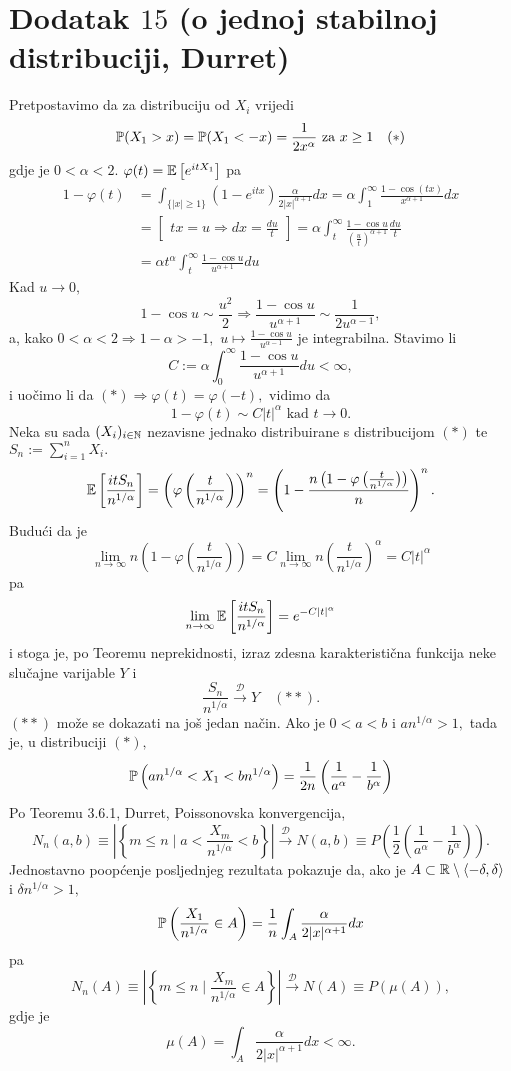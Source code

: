 \documentclass{article}
\begin{document}
\section{Dodatak \(15\) (o jednoj stabilnoj distribuciji, Durret)}
Pretpostavimo da za distribuciju od \(X_i\) vrijedi \[\Bbb P(X_1>x)=\Bbb P(X_1<-x)=\frac1{2x^\alpha}\text{ za }x\ge1\quad(\ast)\] gdje je \(0<\alpha<2.\) \(\varphi(t)=\Bbb E\left[e^{itX_1}\right]\) pa \[\begin{aligned}1-\varphi(t)&=\int_{\{|x|\ge1\}}\left(1-e^{itx}\right)\frac\alpha{2|x|^{\alpha+1}}dx=\alpha\int_1^\infty\frac{1-\cos(tx)}{x^{\alpha+1}}dx\\&=\begin{bmatrix}tx=u\Rightarrow dx=\frac{du}t\end{bmatrix}=\alpha\int_t^\infty\frac{1-\cos u}{\left(\frac{u}t\right)^{\alpha+1}}\frac{du}t\\&=\alpha t^\alpha\int_t^\infty\frac{1-\cos u}{u^{\alpha+1}}du\end{aligned}\] Kad \(u\to0,\) \[1-\cos u\sim\frac{u^2}2\Rightarrow\frac{1-\cos u}{u^{\alpha+1}}\sim\frac1{2u^{\alpha-1}},\] a, kako \(0<\alpha<2\Rightarrow1-\alpha>-1,\) \(u\mapsto\frac{1-\cos u}{u^{\alpha-1}}\) je integrabilna. Stavimo li \[C:=\alpha\int_0^\infty\frac{1-\cos u}{u^{\alpha+1}}du<\infty,\] i uočimo li da \((\ast)\Rightarrow\varphi(t)=\varphi(-t),\) vidimo da \[1-\varphi(t)\sim C|t|^\alpha\text{ kad }t\to0.\] Neka su sada \((X_i)_{i\in\Bbb N}\) nezavisne jednako distribuirane s distribucijom \((\ast)\) te \(S_n:=\sum_{i=1}^nX_i.\) \[\Bbb E\left[\frac{itS_n}{n^{1/\alpha}}\right]=\left(\varphi\left(\frac{t}{n^{1/\alpha}}\right)\right)^n=\left(1-\frac{n\left(1-\varphi\left(\frac{t}{n^{1/\alpha}}\right)\right)}n\right)^n.\] Budući da je \[\lim_{n\to\infty}n\left(1-\varphi\left(\frac{t}{n^{1/\alpha}}\right)\right)=C\lim_{n\to\infty}n\left(\frac{t}{n^{1/\alpha}}\right)^\alpha=C|t|^\alpha\] pa \[\lim_{n\to\infty}\Bbb E\left[\frac{itS_n}{n^{1/\alpha}}\right]=e^{-C|t|^\alpha}\] i stoga je, po Teoremu neprekidnosti, izraz zdesna karakteristična funkcija neke slučajne varijable \(Y\) i \[\frac{S_n}{n^{1/\alpha}}\overset{\mathcal D}{\longrightarrow}Y\quad(\ast\ast).\] \((\ast\ast)\) može se dokazati na još jedan način. Ako je \(0<a<b\) i \(an^{1/\alpha}>1,\) tada je, u distribuciji \((\ast),\) \[\Bbb P\left(an^{1/\alpha}<X_1<bn^{1/\alpha}\right)=\frac1{2n}\left(\frac1{a^\alpha}-\frac1{b^\alpha}\right)\] Po Teoremu 3.6.1, Durret, \textsection Poissonovska konvergencija, \[N_n(a,b)\equiv\left|\left\{m\le n\mid a<\frac{X_m}{n^{1/\alpha}}<b\right\}\right|\overset{\mathcal D}{\longrightarrow}N(a,b)\equiv P\left(\frac12\left(\frac1{a^\alpha}-\frac1{b^\alpha}\right)\right).\] Jednostavno poopćenje posljednjeg rezultata pokazuje da, ako je \(A\subset\Bbb R\setminus\langle-\delta,\delta\rangle\) i \(\delta n^{1/\alpha}>1,\) \[\Bbb P\left(\frac{X_1}{n^{1/\alpha}}\in A\right)=\frac1n\int_A\frac\alpha{2|x|^{\alpha+1}}dx\] pa \[N_n(A)\equiv\left|\left\{m\le n\mid\frac{X_m}{n^{1/\alpha}}\in A\right\}\right|\overset{\mathcal D}{\longrightarrow}N(A)\equiv P(\mu(A)),\] gdje je \[\mu(A)=\int_A\frac\alpha{2|x|^{\alpha+1}}dx<\infty.\] 
\end{document}
